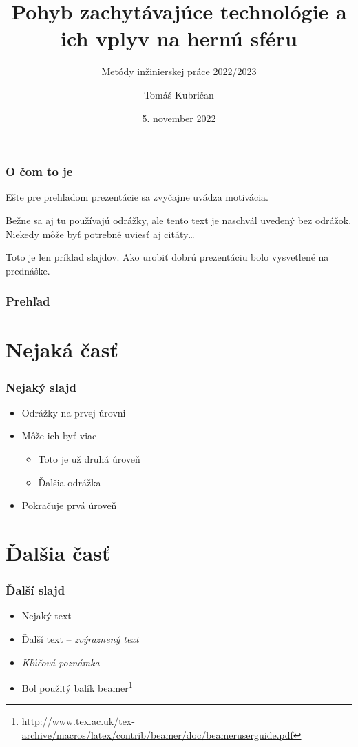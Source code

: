 \documentclass{beamer}
\author{Tomáš Kubričan}
\institute{
	Fakulta informatiky a informačných technológií\\
	Slovenská technická univerzita v Bratislave}
\subtitle{\vspace{3mm} Metódy inžinierskej práce 2022/2023}
\title{Pohyb zachytávajúce technológie a ich vplyv na hernú sféru
}
\date{\footnotesize 5. november 2022}
\newcommand{\footcite}[1]{\footnote{\tiny #1}}
\newcommand{\emp}[1]{\textit{\alert{#1}}}
\newcommand{\ssection}[1]{
	\section{#1}
	\begin{frame}[fragile=singleslide]\frametitle{}
	\Huge #1
	\end{frame}
}
\begin{document}
\begin{frame}[fragile=singleslide]
\titlepage
\end{frame}


\begin{frame}[fragile=singleslide]\frametitle{O čom to je}
Ešte pre prehľadom prezentácie sa zvyčajne uvádza motivácia.

Bežne sa aj tu používajú odrážky, ale tento text je naschvál uvedený bez odrážok. Niekedy môže byť potrebné uviesť aj citáty\ldots{}

Toto je len príklad slajdov. Ako urobiť dobrú prezentáciu bolo vysvetlené na prednáške.
\end{frame}


\begin{frame}[fragile=singleslide]\frametitle{Prehľad}
\tableofcontents
\end{frame}


\section{Nejaká časť}

\begin{frame}[fragile=singleslide]\frametitle{Nejaký slajd}
\begin{itemize}
\item Odrážky na prvej úrovni
\item Môže ich byť viac
	\begin{itemize}
	\item Toto je už druhá úroveň
	\item Ďalšia odrážka
	\end{itemize}
\item Pokračuje prvá úroveň
\end{itemize}
\end{frame}



\section{Ďalšia časť}

\begin{frame}[fragile=singleslide]\frametitle{Ďalší slajd}
\begin{itemize}
\item Nejaký text
\item Ďalší text -- \emph{zvýraznený text}
\item \emp{Kľúčová poznámka} %

\item Bol použitý balík beamer\footcite{\url{http://www.tex.ac.uk/tex-archive/macros/latex/contrib/beamer/doc/beameruserguide.pdf}}
\end{itemize}
\end{frame}
\end{document}
